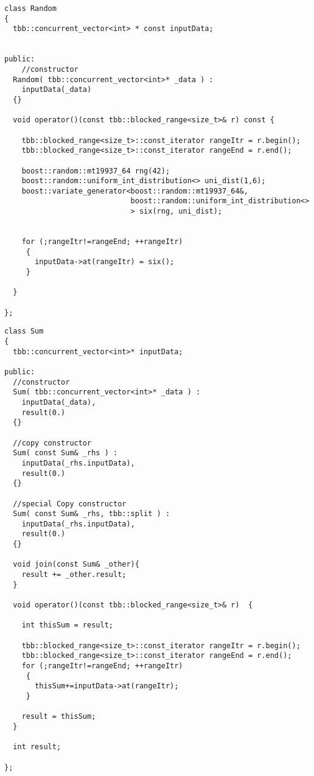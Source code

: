\documentclass[a4paper]{article}
\begin{document}
\newpage
\begin{lstlisting}[float=ht,caption={\large \textbf{Random Class}}]
class Random
{
  tbb::concurrent_vector<int> * const inputData;
  

public:
    //constructor
  Random( tbb::concurrent_vector<int>* _data ) : 
    inputData(_data)
  {}
  
  void operator()(const tbb::blocked_range<size_t>& r) const {

    tbb::blocked_range<size_t>::const_iterator rangeItr = r.begin();
    tbb::blocked_range<size_t>::const_iterator rangeEnd = r.end();

    boost::random::mt19937_64 rng(42);
    boost::random::uniform_int_distribution<> uni_dist(1,6);
    boost::variate_generator<boost::random::mt19937_64&, 
                             boost::random::uniform_int_distribution<> 
                             > six(rng, uni_dist);

    
    for (;rangeItr!=rangeEnd; ++rangeItr)
     {
       inputData->at(rangeItr) = six();
     }
    
  }

};
\end{lstlisting}

\begin{lstlisting}[float=ht,caption={\large \textbf{Sum Class}}]
class Sum
{
  tbb::concurrent_vector<int>* inputData;

public:
  //constructor
  Sum( tbb::concurrent_vector<int>* _data ) : 
    inputData(_data),
    result(0.)
  {}

  //copy constructor
  Sum( const Sum& _rhs ) : 
    inputData(_rhs.inputData),
    result(0.)
  {}
  
  //special Copy constructor
  Sum( const Sum& _rhs, tbb::split ) : 
    inputData(_rhs.inputData),
    result(0.)
  {}

  void join(const Sum& _other){
    result += _other.result;
  }
  
  void operator()(const tbb::blocked_range<size_t>& r)  {

    int thisSum = result;

    tbb::blocked_range<size_t>::const_iterator rangeItr = r.begin();
    tbb::blocked_range<size_t>::const_iterator rangeEnd = r.end();
    for (;rangeItr!=rangeEnd; ++rangeItr)
     {
       thisSum+=inputData->at(rangeItr);
     }
    
    result = thisSum;
  }

  int result;

};
\end{lstlisting}
\end{document}

